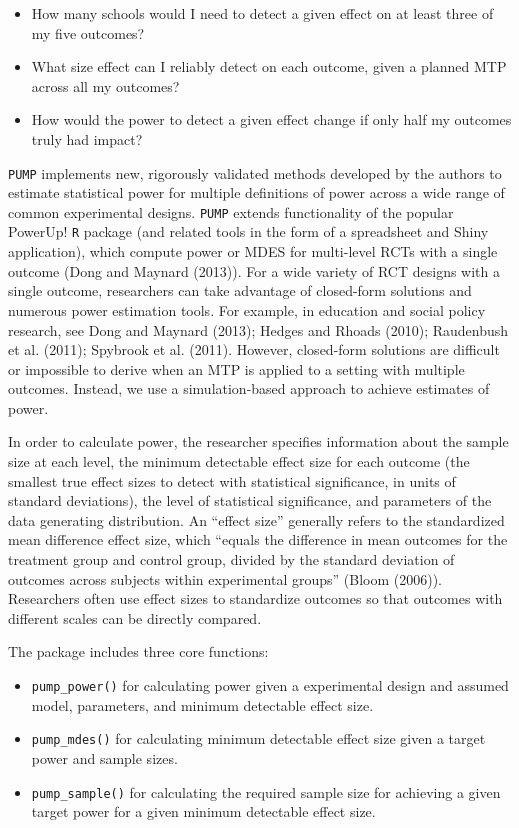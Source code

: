 \documentclass[
]{article}
\providecommand{\tightlist}{%
  \setlength{\itemsep}{0pt}\setlength{\parskip}{0pt}}
\begin{document}
\begin{itemize}
\tightlist
\item
  How many schools would I need to detect a given effect on at least
  three of my five outcomes?
\item
  What size effect can I reliably detect on each outcome, given a
  planned MTP across all my outcomes?
\item
  How would the power to detect a given effect change if only half my
  outcomes truly had impact?
\end{itemize}

\texttt{PUMP} implements new, rigorously validated methods developed by
the authors to estimate statistical power for multiple definitions of
power across a wide range of common experimental designs. \texttt{PUMP}
extends functionality of the popular PowerUp! \texttt{R} package (and
related tools in the form of a spreadsheet and Shiny application), which
compute power or MDES for multi-level RCTs with a single outcome (Dong
and Maynard (2013)). For a wide variety of RCT designs with a single
outcome, researchers can take advantage of closed-form solutions and
numerous power estimation tools. For example, in education and social
policy research, see Dong and Maynard (2013); Hedges and Rhoads (2010);
Raudenbush et al. (2011); Spybrook et al. (2011). However, closed-form
solutions are difficult or impossible to derive when an MTP is applied
to a setting with multiple outcomes. Instead, we use a simulation-based
approach to achieve estimates of power.

In order to calculate power, the researcher specifies information about
the sample size at each level, the minimum detectable effect size for
each outcome (the smallest true effect sizes to detect with statistical
significance, in units of standard deviations), the level of statistical
significance, and parameters of the data generating distribution. An
``effect size'' generally refers to the standardized mean difference
effect size, which ``equals the difference in mean outcomes for the
treatment group and control group, divided by the standard deviation of
outcomes across subjects within experimental groups'' (Bloom (2006)).
Researchers often use effect sizes to standardize outcomes so that
outcomes with different scales can be directly compared.

The package includes three core functions:

\begin{itemize}
\tightlist
\item
  \texttt{pump\_power()} for calculating power given a experimental
  design and assumed model, parameters, and minimum detectable effect
  size.
\item
  \texttt{pump\_mdes()} for calculating minimum detectable effect size
  given a target power and sample sizes.
\item
  \texttt{pump\_sample()} for calculating the required sample size for
  achieving a given target power for a given minimum detectable effect
  size.
\end{itemize}
\end{document}
